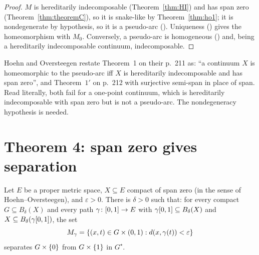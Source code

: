 \begin{proof}
$M$ is hereditarily indecomposable (Theorem~\ref{thm:HI}) and has span zero (Theorem~\ref{thm:theoremC}), so it is snake-like by
Theorem~\ref{thm:ho1}; it is nondegenerate by hypothesis, so it is a pseudo-arc (). Uniqueness
() gives the homeomorphism with $M_0$. Conversely, a pseudo-arc is homogeneous () and,
being a hereditarily indecomposable continuum, indecomposable.
\end{proof}


\begin{remark}\label{rem:ho1-point}
Hoehn and Oversteegen restate Theorem~1 on their p.~211 as: ``a continuum $X$ is homeomorphic to the pseudo-arc iff $X$ is hereditarily
indecomposable and has span zero'', and Theorem~$1'$ on p.~212 with surjective semi-span in place of span. Read literally, both fail for a one-point
continuum, which is hereditarily indecomposable with span zero but is not a pseudo-arc. The nondegeneracy hypothesis is needed.
\end{remark}


\section{Theorem 4: span zero gives separation}

\begin{theorem}\label{thm:ho4}
Let $E$ be a proper metric space, $X\subseteq E$ compact of span zero (in the sense of Hoehn--Oversteegen), and $\varepsilon>0$. There is $\delta>0$
such that: for every compact $G\subseteq B_\delta(X)$ and every path $\gamma\colon[0,1]\to E$ with $\gamma[0,1]\subseteq B_\delta(X)$ and $X\subseteq
B_\delta(\gamma[0,1])$, the set
\[
M_\gamma=\left\{ (x,t)\in G\times(0,1) : d(x,\gamma(t))<\varepsilon \right\}
\]
separates $G\times\left\{ 0 \right\}$ from $G\times\left\{ 1 \right\}$ in $G^\star$.
\end{theorem}

